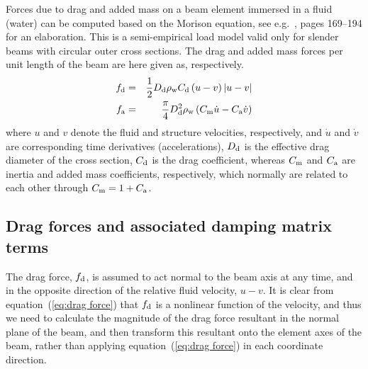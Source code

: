 Forces due to drag and added mass on a beam element immersed in a fluid (water)
can be computed based on the Morison equation, see e.g.~\cite{Chakrabarti},
pages 169--194 for an elaboration.
This is a semi-empirical load model valid only for slender beams with circular
outer cross sections.
The drag and added mass forces per unit length of the beam are here given as,
respectively.
%
\begin{eqnarray}
\label{eq:drag force}
f_{\rm d} &=& \frac{1}{2}D_{\rm d} \rho_{\rm w} C_{\rm d} \left(u-v\right)|u-v| \\
\label{eq:added mass force}
f_{\rm a} &=& \frac{\pi}{4}D_{\rm d}^2 \rho_{\rm w} \left(C_{\rm m}\dot{u}-C_{\rm a}\dot{v}\right)
\end{eqnarray}
%
where $u$ and $v$ denote the fluid and structure velocities, respectively,
and $\dot{u}$ and $\dot{v}$ are corresponding time derivatives (accelerations),
$D_{\rm d}$ is the effective drag diameter of the cross section, $C_{\rm d}$ is the drag
coefficient, whereas $C_{\rm m}$ and $C_{\rm a}$ are inertia and added mass coefficients,
respectively, which normally are related to each other through $C_{\rm m} = 1 + C_{\rm a}$.

\subsection{Drag forces and associated damping matrix terms}

The drag force, $f_{\rm d}$, is assumed to act normal to the beam axis at any
time, and in the opposite direction of the relative fluid velocity, $u-v$.
It is clear from equation~(\ref{eq:drag force}) that $f_{\rm d}$ is a nonlinear
function of the velocity, and thus we need to calculate the magnitude of the
drag force resultant in the normal plane of the beam, and then transform this
resultant onto the element axes of the beam, rather than applying
equation~(\ref{eq:drag force}) in each coordinate direction.

